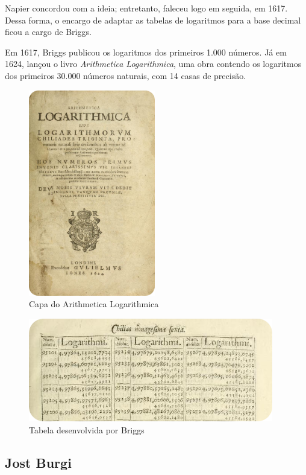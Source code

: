 Napier concordou com a ideia; entretanto, faleceu logo em seguida, em 1617. Dessa forma, o encargo de adaptar as tabelas de logaritmos para a base decimal ficou a cargo de Briggs.

Em 1617, Briggs publicou os logaritmos dos primeiros 1.000 números. Já em 1624, lançou o livro \textit{Arithmetica Logarithmica}, uma obra contendo os logaritmos dos primeiros 30.000 números naturais, com 14 casas de precisão.

\begin{figure}[H]
    \centering
    \includegraphics[height=9cm]{img/capa.png}
    \caption{Capa do Arithmetica Logarithmica}
\end{figure}

\begin{figure}[H]
    \centering
    \includegraphics[height=4.5cm]{img/tabela1.png}
    \caption{Tabela desenvolvida por Briggs}
\end{figure}

\subsection{Jost Burgi}

